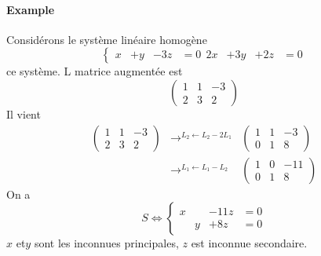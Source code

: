 \paragraph{Example} Considérons le système linéaire homogène
$$\left\{\begin{array}{cccc}
   x & + y & -3z & = 0\ \
  2x & +3y & +2z & = 0
\end{array}$$
ce système. L matrice augmentée est
$$\begin{pmatrix}
 1 & 1 & -3 \\
 2 & 3 & 2
\end{pmatrix}$$
Il vient
\begin{eqnarray*}
  \begin{pmatrix} 
    1 & 1 &-3 \\ 
    2 &3 & 2
  \end{pmatrix} 
  & \rightarrow^{L_2 \leftarrow L_2 - 2L_1} &
  \begin{pmatrix}
    1 & 1 &-3 \\ 
    0 & 1 & 8
  \end{pmatrix} 
  \\
  & \rightarrow^{L_1 \leftarrow L_1 - L_2} &
  \begin{pmatrix} 
    1 & 0 & -11 \\ 
    0 & 1 & 8
  \end{pmatrix}
\end{eqnarray*}
On a 
$$S \Leftrightarrow \left\{\begin{array}{cccc} x & & -11z & = 0 \\ & y & +8z & =0\end{array}$$
$x$ et$y$ sont les inconnues principales, $z$ est inconnue secondaire. \\
